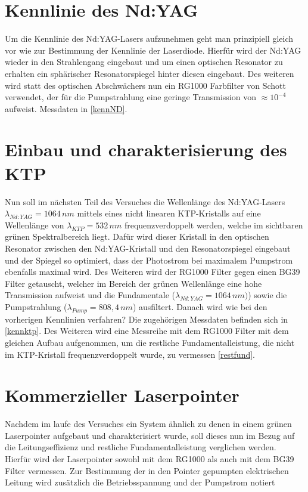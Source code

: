 \documentclass[twoside,colorback,accentcolor=tud4c,11pt]{tudreport}
\begin{document}
\section{Kennlinie des Nd:YAG}\label{v4}
Um die Kennlinie des Nd:YAG-Lasers aufzunehmen geht man prinzipiell gleich vor wie zur Bestimmung der Kennlinie der Laserdiode. Hierfür wird der Nd:YAG wieder in den Strahlengang eingebaut und um einen optischen Resonator zu erhalten ein sphärischer Resonatorspiegel hinter diesen eingebaut. Des weiteren wird statt des optischen Abschwächers nun ein RG1000 Farbfilter von Schott verwendet, der für die Pumpstrahlung eine geringe Transmission von $\approx 10^{-4}$ aufweist. Messdaten in \ref{kennND}.
\section{Einbau und charakterisierung des KTP}\label{v5}
Nun soll im nächsten Teil des Versuches die Wellenlänge des Nd:YAG-Lasers $\lambda_{Nd:YAG}=1064\,\si{nm}$ mittels eines nicht linearen KTP-Kristalls auf eine Wellenlänge von $\lambda_{KTP}=532\,\si{nm}$ frequenzverdoppelt werden, welche im sichtbaren grünen Spektralbereich liegt. Dafür wird dieser Kristall in den optischen Resonator zwischen den Nd:YAG-Kristall und den Resonatorspiegel eingebaut und der Spiegel so optimiert, dass der Photostrom bei maximalem Pumpstrom ebenfalls maximal wird. Des Weiteren wird der RG1000 Filter gegen einen BG39 Filter getauscht, welcher im Bereich der grünen Wellenlänge eine hohe Transmission aufweist und die Fundamentale ($\lambda_{Nd:YAG}=1064\,\si{nm})$) sowie die Pumpstrahlung ($\lambda_{Pump}=808,4\,\si{nm}$) ausfiltert. Danach wird wie bei den vorherigen Kennlinien verfahren? Die zugehörigen Messdaten befinden sich in \ref{kennktp}.
Des Weiteren wird eine Messreihe mit dem RG1000 Filter mit dem gleichen Aufbau aufgenommen, um die restliche Fundamentalleistung, die nicht im KTP-Kristall frequenzverdoppelt wurde, zu vermessen \ref{restfund}.
\section{Kommerzieller Laserpointer}\label{v6}
Nachdem im laufe des Versuches ein System ähnlich zu denen in einem grünen Laserpointer aufgebaut und charakterisiert wurde, soll dieses nun im Bezug auf die Leitungseffizienz und restliche Fundamentalleistung verglichen werden. Hierfür wird der Laserpointer sowohl mit dem RG1000 als auch mit dem BG39 Filter vermessen. Zur Bestimmung der in den Pointer gepumpten elektrischen Leitung wird zusätzlich die Betriebsspannung und der Pumpstrom notiert
  
\end{document}
